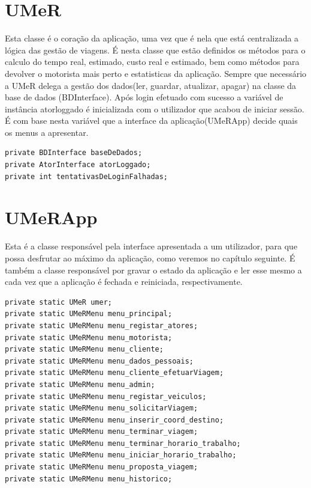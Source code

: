 \section{UMeR}

Esta classe é o coração da aplicação, uma vez que é nela que está centralizada a lógica das gestão de viagens. É nesta classe que estão definidos os métodos para o calculo do tempo real, estimado, custo real e estimado, bem como métodos para devolver o motorista mais perto e estatisticas da aplicação. Sempre que necessário a UMeR delega a gestão dos dados(ler, guardar, atualizar, apagar) na classe da base de dados (BDInterface). 
Após login efetuado com sucesso a variável de instância atorloggado é inicializada com o utilizador que acabou de iniciar sessão. É com base nesta variável que a interface da aplicação(UMeRApp) decide quais os menus a apresentar.  

\begin{verbatim}
private BDInterface baseDeDados;
private AtorInterface atorLoggado;
private int tentativasDeLoginFalhadas;
\end{verbatim}

\section{UMeRApp}

Esta é a classe responsável pela interface apresentada a um utilizador, para que possa desfrutar ao máximo da aplicação, como veremos no capítulo seguinte. É também a classe responsável por gravar o estado da aplicação e ler esse mesmo a cada vez que a aplicação é fechada e reiniciada, respectivamente.

\begin{verbatim}
private static UMeR umer;
private static UMeRMenu menu_principal;
private static UMeRMenu menu_registar_atores;
private static UMeRMenu menu_motorista;
private static UMeRMenu menu_cliente;
private static UMeRMenu menu_dados_pessoais;
private static UMeRMenu menu_cliente_efetuarViagem;
private static UMeRMenu menu_admin;
private static UMeRMenu menu_registar_veiculos;
private static UMeRMenu menu_solicitarViagem; 
private static UMeRMenu menu_inserir_coord_destino;
private static UMeRMenu menu_terminar_viagem; 
private static UMeRMenu menu_terminar_horario_trabalho;
private static UMeRMenu menu_iniciar_horario_trabalho;
private static UMeRMenu menu_proposta_viagem;
private static UMeRMenu menu_historico;
\end{verbatim}




